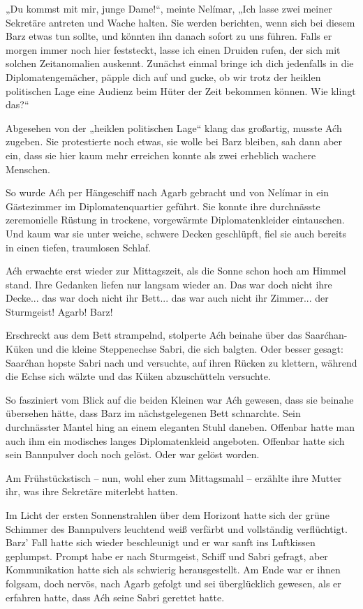 „Du kommst mit mir, junge Dame!“, meinte Nelímar, „Ich lasse zwei meiner Sekretäre antreten und Wache halten. Sie werden berichten, wenn sich bei diesem Barz etwas tun sollte, und könnten ihn danach sofort zu uns führen. Falls er morgen immer noch hier feststeckt, lasse ich einen Druiden rufen, der sich mit solchen Zeitanomalien auskennt. Zunächst einmal bringe ich dich jedenfalls in die Diplomatengemächer, päpple dich auf und gucke, ob wir trotz der heiklen politischen Lage eine Audienz beim Hüter der Zeit bekommen können. Wie klingt das?“

Abgesehen von der „heiklen politischen Lage“ klang das großartig, musste Aćh zugeben. Sie protestierte noch etwas, sie wolle bei Barz bleiben, sah dann aber ein, dass sie hier kaum mehr erreichen konnte als zwei erheblich wachere Menschen.

So wurde Aćh per Hängeschiff nach Agarb gebracht und von Nelímar in ein Gästezimmer im Diplomatenquartier geführt. Sie konnte ihre durchnässte zeremonielle Rüstung in trockene, vorgewärmte Diplomatenkleider eintauschen. Und kaum war sie unter weiche, schwere Decken geschlüpft, fiel sie auch bereits in einen tiefen, traumlosen Schlaf.\bigskip







Aćh erwachte erst wieder zur Mittagszeit, als die Sonne schon hoch am Himmel stand. Ihre Gedanken liefen nur langsam wieder an. Das war doch nicht ihre Decke... das war doch nicht ihr Bett... das war auch nicht ihr Zimmer... der Sturmgeist! Agarb! Barz!

Erschreckt aus dem Bett strampelnd, stolperte Aćh beinahe über das Saarćhan-Küken und die kleine Steppenechse Sabri, die sich balgten. Oder besser gesagt: Saarćhan hopste Sabri nach und versuchte, auf ihren Rücken zu klettern, während die Echse sich wälzte und das Küken abzuschütteln versuchte.

So fasziniert vom Blick auf die beiden Kleinen war Aćh gewesen, dass sie beinahe übersehen hätte, dass Barz im nächstgelegenen Bett schnarchte. Sein durchnässter Mantel hing an einem eleganten Stuhl daneben. Offenbar hatte man auch ihm ein modisches langes Diplomatenkleid angeboten. Offenbar hatte sich sein Bannpulver doch noch gelöst. Oder war gelöst worden.

Am Frühstückstisch – nun, wohl eher zum Mittagsmahl – erzählte ihre Mutter ihr, was ihre Sekretäre miterlebt hatten.

Im Licht der ersten Sonnenstrahlen über dem Horizont hatte sich der grüne Schimmer des Bannpulvers leuchtend weiß verfärbt und vollständig verflüchtigt. Barz’ Fall hatte sich wieder beschleunigt und er war sanft ins Luftkissen geplumpst. Prompt habe er nach Sturmgeist, Schiff und Sabri gefragt, aber Kommunikation hatte sich als schwierig herausgestellt. Am Ende war er ihnen folgsam, doch nervös, nach Agarb gefolgt und sei überglücklich gewesen, als er erfahren hatte, dass Aćh seine Sabri gerettet hatte.

